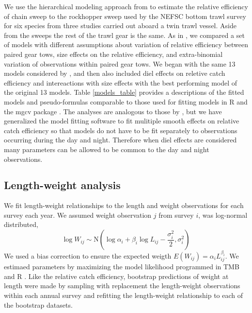 \documentclass[12pt,letterpaper, leqno]{article}
\begin{document}
We use the hierarchical modeling approach from \citet{miller13} to estimate the relative efficiency of chain sweep to the rockhopper sweep used by the NEFSC bottom trawl survey for six species from three studies carried out aboard a twin trawl vessel. Aside from the sweeps the rest of the trawl gear is the same.  As in \citet{miller13}, we compared a set of models with different assumptions about variation of relative efficiency between paired gear tows, size effects on the relative efficiency, and extra-binomial variation of observations within paired gear tows. We began with the same 13 models considered by \citet{miller13}, and then also included diel effects on reletive catch efficiency and intereactions with size effects with the best performing model of the original 13 models. Table \ref{models_table} provides a descriptions of the fitted models and pseudo-formulas comparable to those used for fitting models in R and the mgcv package \citep{R19,wood06}. The analyses are analogous to those by \citet{milleretal17a,milleretal17b,milleretal18}, but we have generalized the model fitting software to fit mulitiple smooth effects on relative catch efficiency so that models do not have to be fit separately to observations occurring during the day and night. Therefore when diel effects are considered many parameters can be allowed to be common to the day and night observations. 

\subsection*{Length-weight analysis}

We fit length-weight relationships to the length and weight observations for each survey each year. We assumed weight observation $j$ from survey $i$, was log-normal distributed,
\begin{equation}\label{wal}
 \log W_{ij} \sim \text{N}\left(\log \alpha_i + \beta_i \log L_{ij} - \frac{\sigma_i^2}{2}, \sigma_i^2\right)
\end{equation}
We used a bias correction to ensure the expected weigth $E(W_{ij})= \alpha_i L_{ij}^{\beta_i}$. We estimaed parameters by maximizing the model likelihood programmed in TMB \citep{kristensenetal16} and R \citep{R19}. Like the relative catch efficiency, bootstrap predictions of weight at length were made by sampling with replacement the length-weight observations within each annual survey and refitting the length-weight relationship to each of the bootstrap datasets.
\end{document}
